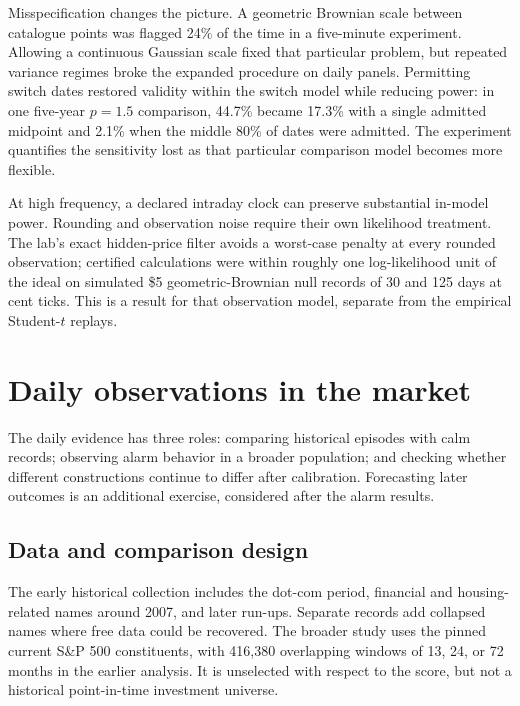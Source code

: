 Misspecification changes the picture. A geometric Brownian scale between
catalogue points was flagged 24\% of the time in a five-minute experiment.
Allowing a continuous Gaussian scale fixed that particular problem, but
repeated variance regimes broke the expanded procedure on daily panels.
Permitting switch dates restored validity within the switch model while
reducing power: in one five-year $p=1.5$ comparison, 44.7\% became 17.3\%
with a single admitted midpoint and 2.1\% when the middle 80\% of dates
were admitted. The experiment quantifies the sensitivity lost as that
particular comparison model becomes more flexible.

At high frequency, a declared intraday clock can preserve substantial
in-model power. Rounding and observation noise require their own
likelihood treatment. The lab's exact hidden-price filter avoids a
worst-case penalty at every rounded observation; certified calculations
were within roughly one log-likelihood unit of the ideal on simulated
\$5 geometric-Brownian null records of 30 and 125 days at cent ticks.
This is a result for that observation model, separate from the empirical
Student-$t$ replays.

\section{Daily observations in the market}\label{sec:dailyresults}
The daily evidence has three roles: comparing historical episodes with calm
records; observing alarm behavior in a broader population; and checking
whether different constructions continue to differ after calibration.
Forecasting later outcomes is an additional exercise, considered after the
alarm results.

\subsection{Data and comparison design}
The early historical collection includes the dot-com period, financial and
housing-related names around 2007, and later run-ups. Separate records add
collapsed names where free data could be recovered. The broader study uses
the pinned current S\&P 500 constituents, with 416,380 overlapping windows
of 13, 24, or 72 months in the earlier analysis. It is unselected with
respect to the score, but not a historical point-in-time investment
universe.

